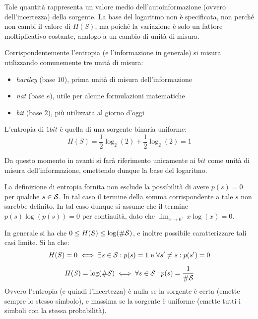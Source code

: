 Tale quantità rappresenta un valore medio dell'autoinformazione (ovvero dell'incertezza) della sorgente.
La base del logaritmo non è specificata, non perché non cambi il valore di \(H(S)\), ma poiché la variazione è solo un fattore moltiplicativo costante, analogo a un cambio di unità di misura.

Corrispondentemente l'entropia (e l'informazione in generale) si misura utilizzando comunemente tre unità di misura:
\begin{itemize}
  \item \emph{hartley} (base \(10\)), prima unità di misura dell'informazione
  \item \emph{nat} (base \(e\)), utile per alcune formulazioni matematiche
  \item \emph{bit} (base \(2\)), più utilizzata al giorno d'oggi
\end{itemize}
L'entropia di \(1 bit\) è quella di una sorgente binaria uniforme:
\[H(S) = \frac{1}{2}\log_2(2) + \frac{1}{2}\log_2(2) = 1\]

Da questo momento in avanti si farà riferimento unicamente ai \(bit\) come unità di misura dell'informazione, omettendo dunque la base del logaritmo.

\begin{note}
  La definizione di entropia fornita non esclude la possibilità di avere \(p(s) = 0\) per qualche \(s \in \mathcal{S}\).
  In tal caso il termine della somma corrispondente a tale \(s\) non sarebbe definito.
  In tal caso dunque si assume che il termine \(p(s)\log(p(s)) = 0\) per continuità, dato che \(\lim_{x \to 0^+} x \log(x) = 0\).
\end{note}

In generale si ha che \(0 \leq H(S) \leq \log(\#\mathcal{S})\), e inoltre possibile caratterizzare tali casi limite. Si ha che:
\begin{equation}\label{eq:entropia_limite_inferiore}
    H(S) = 0 \iff \exists s \in \mathcal{S}: p(s) = 1 \text{ e } \forall s' \neq s: p(s') = 0
  \end{equation}

\begin{equation}\label{eq:entropia_limite_superiore}
  H(S) = \log(\#\mathcal{S}) \iff \forall s \in \mathcal{S}: p(s) = \frac{1}{\#\mathcal{S}}
\end{equation}
Ovvero l'entropia (e quindi l'incertezza) è nulla se la sorgente è certa (emette sempre lo stesso simbolo), e massima se la sorgente è uniforme (emette tutti i simboli con la stessa probabilità).

